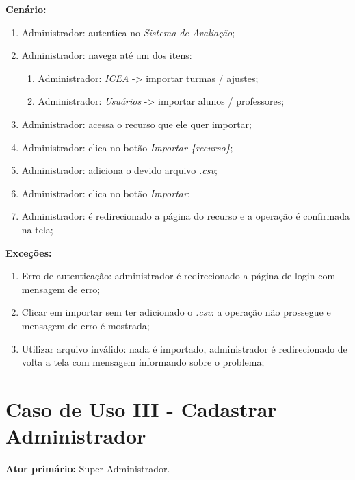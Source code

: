 \documentclass[
  12pt,       %
  openright,      %
  oneside,      %
  a4paper,      %
  english,      %
  french,        %
  spanish,     %
  brazil        %
  ]{abntex2-decsi}
\begin{document}
\begin{apendicesenv}
\begin{enumerate}
            \end{enumerate}
        
		\textbf{Cenário:}
		
		\begin{enumerate}
			\item Administrador: autentica no \textit{Sistema de Avaliação};
            \item Administrador: navega até um dos itens:
            \begin{enumerate}
            \item Administrador: \textit{ICEA} -> importar turmas / ajustes;
            \item Administrador: \textit{Usuários} -> importar alunos / professores;
            \end{enumerate}
			\item Administrador: acessa o recurso que ele quer importar;
			\item Administrador: clica no botão \textit{Importar \{recurso\}};
			\item Administrador: adiciona o devido arquivo \textit{.csv};
            \item Administrador: clica no botão \textit{Importar};
            \item Administrador: é redirecionado a página do recurso e a operação é confirmada na tela;
		\end{enumerate}
		
		\textbf{Exceções:}
		
			\begin{enumerate}	
				\item Erro de autenticação: administrador é redirecionado a página de login com mensagem de erro;
				\item Clicar em importar sem ter adicionado o \textit{.csv}: a operação não prossegue e mensagem de erro é mostrada;
                \item Utilizar arquivo inválido: nada é importado, administrador é redirecionado de volta a tela com mensagem informando sobre o problema;
			\end{enumerate}
    
    \newpage
    
    \section{Caso de Uso III - Cadastrar Administrador}
    
	\textbf{Ator primário:} Super Administrador.
				

\end{apendicesenv}
\end{document}

